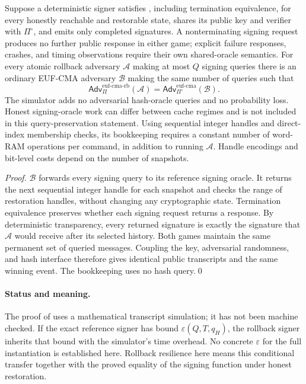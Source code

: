 \documentclass[a4paper,envcountsame,runningheads]{llncs}
\newcommand{\Adv}{\mathsf{Adv}}
\newcommand{\eps}{\varepsilon}
\begin{document}
\begin{theorem}\label{thm:transfer}
Suppose a deterministic signer satisfies , including termination equivalence, for every honestly reachable and restorable state, shares its public key and verifier with $\Pi^\circ$, and emits only completed signatures. A nonterminating signing request produces no further public response in either game; explicit failure responses, crashes, and timing observations require their own shared-oracle semantics. For every atomic rollback adversary $\mathcal A$ making at most $Q$ signing queries there is an ordinary EUF-CMA adversary $\mathcal B$ making the same number of queries such that
\[
 \Adv^{\mathrm{euf\text{-}cma\text{-}rb}}_\Pi(\mathcal A)
 =\Adv^{\mathrm{euf\text{-}cma}}_{\Pi^\circ}(\mathcal B).
\]
The simulator adds no adversarial hash-oracle queries and no probability loss. Honest signing-oracle work can differ between cache regimes and is not included in this query-preservation statement. Using sequential integer handles and direct-index membership checks, its bookkeeping requires a constant number of word-RAM operations per command, in addition to running $\mathcal A$. Handle encodings and bit-level costs depend on the number of snapshots.
\end{theorem}
\begin{proof}
$\mathcal B$ forwards every signing query to its reference signing oracle. It returns the next sequential integer handle for each snapshot and checks the range of restoration handles, without changing any cryptographic state. Termination equivalence preserves whether each signing request returns a response. By deterministic transparency, every returned signature is exactly the signature that $\mathcal A$ would receive after its selected history. Both games maintain the same permanent set of queried messages. Coupling the key, adversarial randomness, and hash interface therefore gives identical public transcripts and the same winning event. The bookkeeping uses no hash query.\qed
\end{proof}

\paragraph{Status and meaning.}
The proof of  uses a mathematical transcript simulation; it has not been machine checked. If the exact reference signer has bound $\eps(Q,T,q_H)$, the rollback signer inherits that bound with the simulator's time overhead. No concrete $\eps$ for the full instantiation is established here. Rollback resilience here means this conditional transfer together with the proved equality of the signing function under honest restoration.
\end{document}
